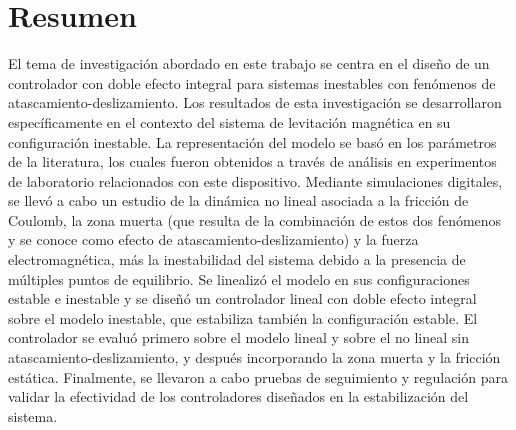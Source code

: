 \chapter{Resumen}\label{Chap:Resumen}

El tema de investigación abordado en este trabajo se centra en el diseño de un controlador con doble efecto integral para sistemas inestables con fenómenos de atascamiento-deslizamiento. Los resultados de esta investigación se desarrollaron específicamente en el contexto del sistema de levitación magnética en su configuración inestable. La representación del modelo se basó en los parámetros de la literatura, los cuales fueron obtenidos a través de análisis en experimentos de laboratorio relacionados con este dispositivo. Mediante simulaciones digitales, se llevó a cabo un estudio de la dinámica no lineal asociada a la fricción de Coulomb, la zona muerta (que resulta de la combinación de estos dos fenómenos y se conoce como efecto de atascamiento-deslizamiento) y la fuerza electromagnética, más la inestabilidad del sistema debido a la presencia de múltiples puntos de equilibrio. Se linealizó el modelo en sus configuraciones estable e inestable y se diseñó un controlador lineal con doble efecto integral sobre el modelo inestable, que estabiliza también la configuración estable. El controlador se evaluó primero sobre el modelo lineal y sobre el no lineal sin atascamiento-deslizamiento, y después incorporando la zona muerta y la fricción estática. Finalmente, se llevaron a cabo pruebas de seguimiento y regulación para validar la efectividad de los controladores diseñados en la estabilización del sistema.